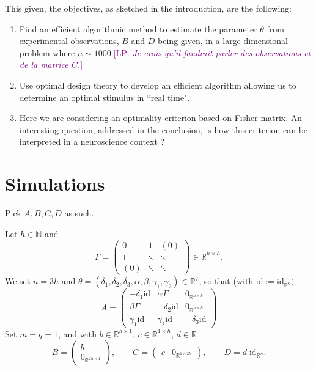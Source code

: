 \documentclass[twocolumn]{autart}
\newcommand{\LP}[1]{{\textcolor{purple}{[LP: \textit{#1}]}}}
\theoremstyle{definition}
\theoremstyle{remark}
\newcommand{\R}{\mathbb{R}}
\newcommand{\N}{\mathbb{N}}
\newcommand{\id}{\mathrm{id}}
\begin{document}
This given, the objectives, as sketched in the introduction, are the following:
 \begin{enumerate}
     \item Find an efficient algorithmic method to estimate the parameter $\theta$ from experimental observations, $B$ and $D$ being given, in a large dimensional problem where $n \sim 1000$.\LP{Je crois qu'il faudrait parler des observations et de la matrice $C$.}
     \item Use optimal design theory to develop an efficient algorithm allowing us to determine an optimal stimulus in ``real time".
     \item Here we are considering an optimality criterion based on Fisher matrix. An interesting question, addressed in the conclusion, is how this criterion can be interpreted in a neuroscience context ?
 \end{enumerate}


\section{Simulations}

Pick $A,B,C,D$ as such.

Let $h\in \N$ and 
$$
\Gamma = 
\begin{pmatrix}
0 & 1 &(0)
\\
1 & \ddots & \ddots
\\
(0)& \ddots&\ddots
\end{pmatrix}\in \R^{h\times h}.
$$
We set $n=3h$ and $\theta = (\delta_1,\delta_2,\delta_3,\alpha,\beta,\gamma_1,\gamma_2)\in \R^7$, so that (with $\id:=\id_{\R^{k}})$
$$
A=
\begin{pmatrix}
-\delta_1 \id & \alpha \Gamma & 0_{\R^{h\times h}}
\\
\beta \Gamma & -\delta_2 \id & 0_{\R^{h\times h}}
\\
\gamma_1 \id & \gamma_2 \id & -\delta_3 \id
\end{pmatrix}
$$
Set $m=q=1$, and with $b\in \R^{h\times 1}$, $c\in \R^{1\times h}$, $d\in \R$
$$
B=
\begin{pmatrix}
b
\\
0_{\R^{2h\times 1}}
\end{pmatrix},\qquad
C
=
\begin{pmatrix}
c
&
0_{\R^{1\times 2h}}
\end{pmatrix},
\qquad D= d \; \id_{\R^n}.
$$





\end{document}
